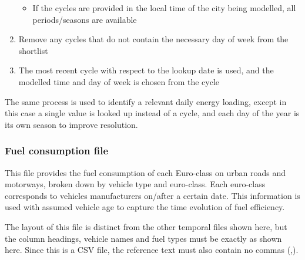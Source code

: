 \documentclass[letterpaper,10pt,english]{sphinxmanual}
\begin{document}
\begin{enumerate}
\begin{itemize}
\item {} 
If the cycles are provided in the local time of the city being
modelled, all periods/seasons are available

\end{itemize}

\item {} 
Remove any cycles that do not contain the necessary day of week from
the shortlist

\item {} 
The most recent cycle with respect to the lookup date is used, and
the modelled time and day of week is chosen from the cycle

\end{enumerate}

The same process is used to identify a relevant daily energy loading,
except in this case a single value is looked up instead of a cycle, and
each day of the year is its own season to improve resolution.


\subsubsection{Fuel consumption file}
\label{\detokenize{OtherManuals/GQF_Manual:fuel-consumption-file}}
This file provides the fuel consumption of each Euro-class on urban
roads and motorways, broken down by vehicle type and euro-class. Each
euro-class corresponds to vehicles manufacturers on/after a certain
date. This information is used with assumed vehicle age to capture the
time evolution of fuel efficiency.

The layout of this file is distinct from the other temporal files shown
here, but the column headings, vehicle names and fuel types must be
exactly as shown here. Since this is a CSV file, the reference text must
also contain no commas (,).
\end{document}
